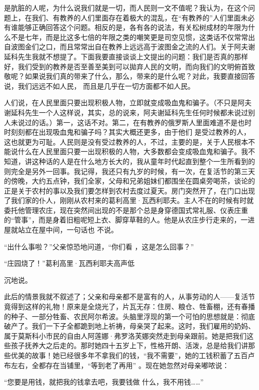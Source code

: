 \documentclass{article}
\begin{document}
\newpage
是肮脏的人呢，为什么说我们就是一切，而人民则一文不值呢？我认为，在这个问题上，在我们、有教养的人们里面存在着极大的混乱，在“有教养的”人们里面未必有谁能够正确回答这个问题。相反的是，各有各的说法，有关松树成材的年限为什么不是七年，而是比这多七倍的年限之类的嘲笑更是司空见惯，这类话不仅常常出自波图金们之口，而且常常出自在教养上远远高于波图金之流的人们。关于阿夫谢延科先生我就不想提了。下面我要直接谈谈上文提出的问题：我们是否真的那样好，我们受到的教养是否至善至美到可以拋弃人民的文明，而向我们的文明俯首致敬呢？如果说我们真的带来了什么，那么，带来的是什么呢？对此，我要直接回答说，我们远远不如人民，
而且是几乎在一切方面都不如人民。 

人们说，在人民里面只要出现积极人物，立即就变成吸血鬼和骗子。（不只是阿夫谢延科先生一个人这样说，其实，总的说来，阿夫谢延科先生任何时候都未说过别人未说过的话。）第一，这话不对。第二，在有教养的俄罗斯人里面难道不是也时时刻刻都在出现吸血鬼和骗子吗？其实大概还更多，由于他们
\newpage
是受过教养的人，这也就更为可耻。人民则是没有受过教养的人，不过，主要的是，关于人民根本不能说什么在人民里面只要一出现积极的人物，大多数都会变成吸血鬼和骗子。我不知道，讲这种话的人是在什么地方长大的，我从童年时代起直到整个一生所看到的则完全是另外一回事。我记得，我还只有九岁的时候，有一次，在复活节的第三天的傍晚，大约五点钟，我们全家，父母和兄弟姐妹们都围坐在圆桌旁喝茶，谈论的正是关于农村的事以及我们要怎样到农村去度过夏天。房门突然开了，在门口出现了我们家的仆人，刚刚从农村来的葛利高里·瓦西利耶夫。主人不在的时候有时就委托他管理农庄，现在突然间出现的不是那个总是身穿德国式常礼服、仪表庄重的“管事”，而是身着旧粗呢短上衣、脚穿草鞋的人。他是从农庄步行走来的，一进屋就站立在屋中间，一句话也
不说。 

“出什么事啦？”父亲惊恐地问道，“你们看
，这是怎么回事？” 

“庄园烧了！”葛利高里·瓦西利耶夫高声低
\newpage

沉地说。 

此后的情景我就不叙述了；父亲和母亲都不是富有的人，从事劳动的人——复活节竟得到这样的礼物！原来是全烧光了，片瓦无存：住房、粮仓、牲畜棚，还有春播的种子、一部分牲畜、农民阿尔希波。头脑里浮现的第一个可怕的思想就是：彻底破产了。我们一下子全都跪到地上祈祷，母亲哭了起来。这时，我们雇用的奶妈、属于莫斯科小市民的自由人阿莲娜·弗罗洛芙娜突然走到母亲跟前。她是把我们这些孩子抚养大之后走的。那时她四十五岁上下，性格开朗、活泼，总是给我们讲那些优美的故事！她已经很多年不拿我们的钱，“我不需要”，她的工钱积蓄了五百卢布左右，全都存在当铺里，“等到老了再用”
。现在她忽然对母亲嘟哝说： 

“您要是用钱，就把我的钱拿去吧，我要钱做
什么，我不用钱……” 
\end{document}
